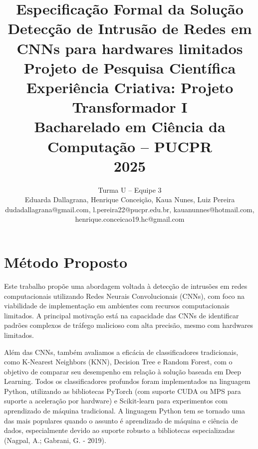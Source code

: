 \documentclass[conference]{IEEEtran}
\begin{document}

\title{Especificação Formal da Solução\\
\vspace{0.4cm}
Detecção de Intrusão de Redes em CNNs para hardwares limitados\\
\vspace{0.4cm}
{\Large Projeto de Pesquisa Científica\\
Experiência Criativa: Projeto Transformador I\\
Bacharelado em Ciência da Computação -- PUCPR\\
2025}}

\author{
    Turma {U} -- Equipe {3} \\
    Eduarda Dallagrana, Henrique Conceição, Kaua Nunes, Luiz Pereira\\
    {\centering\small dudadallagrana@gmail.com, l.pereira22@pucpr.edu.br, kauanunnes@hotmail.com, henrique.conceicao19.hc@gmail.com}
}


\maketitle

\section{Método Proposto}

    Este trabalho propõe uma abordagem voltada à detecção de intrusões em redes computacionais utilizando Redes Neurais Convolucionais (CNNs), com foco na viabilidade de implementação em ambientes com recursos computacionais limitados. A principal motivação está na capacidade das CNNs de identificar padrões complexos de tráfego malicioso com alta precisão, mesmo com hardwares limitados.
    
    Além das CNNs, também avaliamos a eficácia de classificadores tradicionais, como K-Nearest Neighbors (KNN), Decision Tree e Random Forest, com o objetivo de comparar seu desempenho em relação à solução baseada em Deep Learning. Todos os classificadores profundos foram implementados na linguagem Python, utilizando as bibliotecas PyTorch (com suporte CUDA ou MPS para suporte a aceleração por hardware) e Scikit-learn para experimentos com aprendizado de máquina tradicional. A linguagem Python tem se tornado uma das mais populares quando o assunto é aprendizado de máquina e ciência de dados, especialmente devido ao suporte robusto a bibliotecas especializadas (Nagpal, A.; Gabrani, G. - 2019).
    
\end{document}
